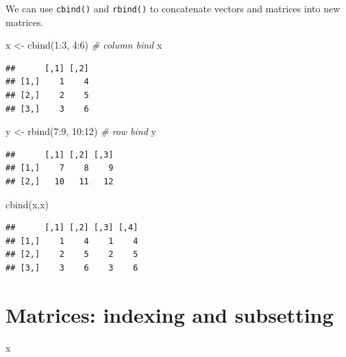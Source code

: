 \documentclass[
  11pt,
]{book}
\newenvironment{Shaded}{\begin{snugshade}}{\end{snugshade}}
\newcommand{\CommentTok}[1]{\textcolor[rgb]{0.56,0.35,0.01}{\textit{#1}}}
\newcommand{\DecValTok}[1]{\textcolor[rgb]{0.00,0.00,0.81}{#1}}
\newcommand{\FunctionTok}[1]{\textcolor[rgb]{0.00,0.00,0.00}{#1}}
\newcommand{\NormalTok}[1]{#1}
\newcommand{\OtherTok}[1]{\textcolor[rgb]{0.56,0.35,0.01}{#1}}
\newcommand{\SpecialCharTok}[1]{\textcolor[rgb]{0.00,0.00,0.00}{#1}}
\begin{document}
We can use \texttt{cbind()} and \texttt{rbind()} to concatenate vectors and matrices into new matrices.

\begin{Shaded}
\begin{Highlighting}[]
\NormalTok{x }\OtherTok{\textless{}{-}} \FunctionTok{cbind}\NormalTok{(}\DecValTok{1}\SpecialCharTok{:}\DecValTok{3}\NormalTok{, }\DecValTok{4}\SpecialCharTok{:}\DecValTok{6}\NormalTok{) }\CommentTok{\# column bind}
\NormalTok{x}
\end{Highlighting}
\end{Shaded}

\begin{verbatim}
##      [,1] [,2]
## [1,]    1    4
## [2,]    2    5
## [3,]    3    6
\end{verbatim}

\begin{Shaded}
\begin{Highlighting}[]
\NormalTok{y }\OtherTok{\textless{}{-}} \FunctionTok{rbind}\NormalTok{(}\DecValTok{7}\SpecialCharTok{:}\DecValTok{9}\NormalTok{, }\DecValTok{10}\SpecialCharTok{:}\DecValTok{12}\NormalTok{) }\CommentTok{\# row bind}
\NormalTok{y}
\end{Highlighting}
\end{Shaded}

\begin{verbatim}
##      [,1] [,2] [,3]
## [1,]    7    8    9
## [2,]   10   11   12
\end{verbatim}

\begin{Shaded}
\begin{Highlighting}[]
\FunctionTok{cbind}\NormalTok{(x,x)}
\end{Highlighting}
\end{Shaded}

\begin{verbatim}
##      [,1] [,2] [,3] [,4]
## [1,]    1    4    1    4
## [2,]    2    5    2    5
## [3,]    3    6    3    6
\end{verbatim}

\hypertarget{matrices-indexing-and-subsetting}{%
\section{Matrices: indexing and subsetting}\label{matrices-indexing-and-subsetting}}

\begin{Shaded}
\begin{Highlighting}[]
\NormalTok{x}
\end{Highlighting}
\end{Shaded}
\end{document}
